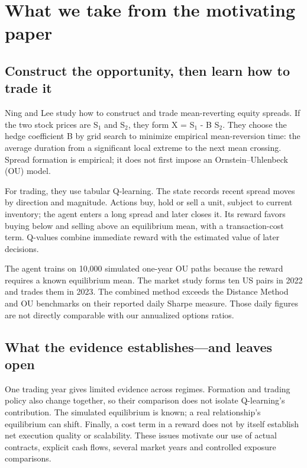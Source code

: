 \section{What we take from the motivating paper}\label{sec:2}

\subsection*{Construct the opportunity, then learn how to trade it}

Ning and Lee \cite{ning2024} study how to construct and trade mean-reverting equity spreads. If the two stock prices are S\(_1\) and S\(_2\), they form X = S\(_1\) - B S\(_2\). They choose the hedge coefficient B by grid search to minimize empirical mean-reversion time: the average duration from a significant local extreme to the next mean crossing. Spread formation is empirical; it does not first impose an Ornstein--Uhlenbeck (OU) model.


For trading, they use tabular Q-learning. The state records recent spread moves by direction and magnitude. Actions buy, hold or sell a unit, subject to current inventory; the agent enters a long spread and later closes it. Its reward favors buying below and selling above an equilibrium mean, with a transaction-cost term. Q-values combine immediate reward with the estimated value of later decisions.


The agent trains on 10,000 simulated one-year OU paths because the reward requires a known equilibrium mean. The market study forms ten US pairs in 2022 and trades them in 2023. The combined method exceeds the Distance Method and OU benchmarks on their reported daily Sharpe measure. Those daily figures are not directly comparable with our annualized options ratios.


\subsection*{What the evidence establishes---and leaves open}

One trading year gives limited evidence across regimes. Formation and trading policy also change together, so their comparison does not isolate Q-learning's contribution. The simulated equilibrium is known; a real relationship's equilibrium can shift. Finally, a cost term in a reward does not by itself establish net execution quality or scalability. These issues motivate our use of actual contracts, explicit cash flows, several market years and controlled exposure comparisons.


